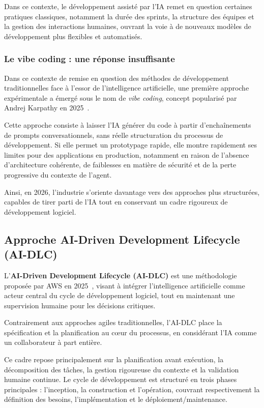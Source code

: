 Dans ce contexte, le développement assisté par l'IA remet en question certaines pratiques classiques, notamment la durée des sprints, la structure des équipes et la gestion des interactions humaines, ouvrant la voie à de nouveaux modèles de développement plus flexibles et automatisés.

\subsubsection{Le vibe coding : une réponse insuffisante}

Dans ce contexte de remise en question des méthodes de développement traditionnelles face à l'essor de l'intelligence artificielle, une première approche expérimentale a émergé sous le nom de \textit{vibe coding}, concept popularisé par Andrej Karpathy en 2025~\cite{sarkar2025vibecoding}.

Cette approche consiste à laisser l'IA générer du code à partir d'enchaînements de prompts conversationnels, sans réelle structuration du processus de développement. Si elle permet un prototypage rapide, elle montre rapidement ses limites pour des applications en production, notamment en raison de l'absence d'architecture cohérente, de faiblesses en matière de sécurité et de la perte progressive du contexte de l'agent.

Ainsi, en 2026, l'industrie s'oriente davantage vers des approches plus structurées, capables de tirer parti de l'IA tout en conservant un cadre rigoureux de développement logiciel.

\subsection{Approche AI-Driven Development Lifecycle (AI-DLC)}

L'\textbf{AI-Driven Development Lifecycle (AI-DLC)} est une méthodologie proposée par AWS en 2025~\cite{awsblog2025}, visant à intégrer l'intelligence artificielle comme acteur central du cycle de développement logiciel, tout en maintenant une supervision humaine pour les décisions critiques.

Contrairement aux approches agiles traditionnelles, l'AI-DLC place la spécification et la planification au c{\oe}ur du processus, en considérant l'IA comme un collaborateur à part entière.

Ce cadre repose principalement sur la planification avant exécution, la décomposition des tâches, la gestion rigoureuse du contexte et la validation humaine continue. Le cycle de développement est structuré en trois phases principales : l'inception, la construction et l'opération, couvrant respectivement la définition des besoins, l'implémentation et le déploiement/maintenance.

